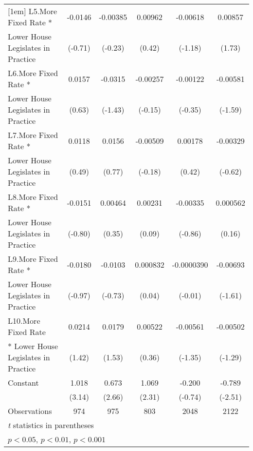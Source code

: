 {\begin{tabular}{l*{5}{c}}
[1em]
L5.More Fixed Rate *&     -0.0146         &    -0.00385         &     0.00962         &    -0.00618         &     0.00857         \\
Lower House Legislates in Practice&     (-0.71)         &     (-0.23)         &      (0.42)         &     (-1.18)         &      (1.73)         \\
[1em]
L6.More Fixed Rate *&      0.0157         &     -0.0315         &    -0.00257         &    -0.00122         &    -0.00581         \\
Lower House Legislates in Practice&      (0.63)         &     (-1.43)         &     (-0.15)         &     (-0.35)         &     (-1.59)         \\
[1em]
L7.More Fixed Rate *&      0.0118         &      0.0156         &    -0.00509         &     0.00178         &    -0.00329         \\
Lower House Legislates in Practice&      (0.49)         &      (0.77)         &     (-0.18)         &      (0.42)         &     (-0.62)         \\
[1em]
L8.More Fixed Rate *&     -0.0151         &     0.00464         &     0.00231         &    -0.00335         &    0.000562         \\
Lower House Legislates in Practice&     (-0.80)         &      (0.35)         &      (0.09)         &     (-0.86)         &      (0.16)         \\
[1em]
L9.More Fixed Rate *&     -0.0180         &     -0.0103         &    0.000832         &  -0.0000390         &    -0.00693         \\
Lower House Legislates in Practice&     (-0.97)         &     (-0.73)         &      (0.04)         &     (-0.01)         &     (-1.61)         \\
[1em]
L10.More Fixed Rate &      0.0214         &      0.0179         &     0.00522         &    -0.00561         &    -0.00502         \\
* Lower House Legislates in Practice&      (1.42)         &      (1.53)         &      (0.36)         &     (-1.35)         &     (-1.29)         \\
[1em]
Constant            &       1.018\sym{**} &       0.673\sym{**} &       1.069\sym{*}  &      -0.200         &      -0.789\sym{*}  \\
                    &      (3.14)         &      (2.66)         &      (2.31)         &     (-0.74)         &     (-2.51)         \\
\hline
Observations        &         974         &         975         &         803         &        2048         &        2122         \\
\hline\hline
\multicolumn{6}{l}{\footnotesize \textit{t} statistics in parentheses}\\
\multicolumn{6}{l}{\footnotesize \sym{*} \(p<0.05\), \sym{**} \(p<0.01\), \sym{***} \(p<0.001\)}\\
\end{tabular}
}
